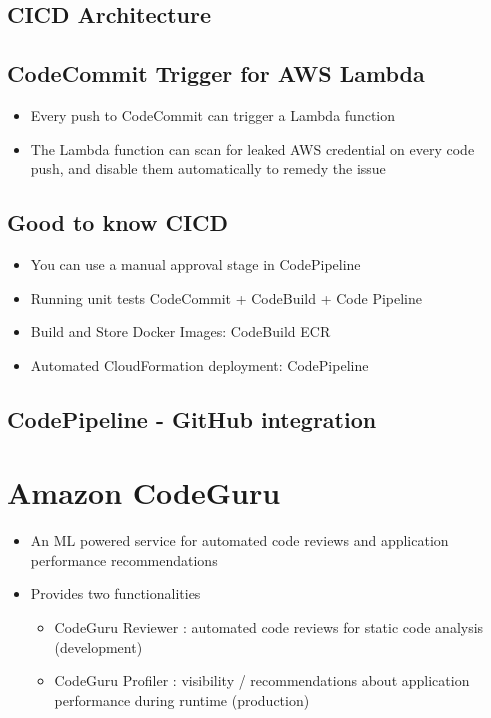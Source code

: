 \subsection{CICD Architecture}

\subsection{CodeCommit Trigger for AWS Lambda}
\begin{itemize}
    \item Every push to CodeCommit can trigger a Lambda function
    \item The Lambda function can scan for leaked AWS credential on every code push, and disable them automatically to remedy the issue
\end{itemize}

\subsection{Good to know CICD}
\begin{itemize}
    \item You can use a manual approval stage in CodePipeline
    \item Running unit tests CodeCommit + CodeBuild + Code Pipeline
    \item Build and Store Docker Images: CodeBuild ECR
    \item Automated CloudFormation deployment: CodePipeline
\end{itemize}

\subsection{CodePipeline - GitHub integration}


\section{Amazon CodeGuru}
\begin{itemize}
    \item An ML powered service for automated code reviews and application performance recommendations
    \item Provides two functionalities
    \begin{itemize}
        \item CodeGuru Reviewer : automated code reviews for static code analysis (development)
        \item CodeGuru Profiler : visibility / recommendations about application performance during runtime (production)
    \end{itemize}
\end{itemize}

